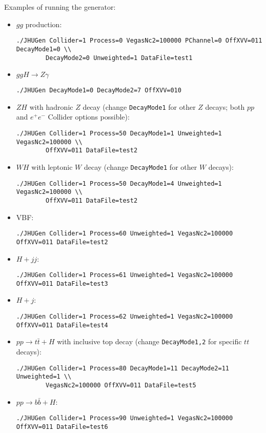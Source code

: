\documentclass[aps,superscriptaddress,nofootinbib]{revtex4}
\begin{document}
Examples of running the generator:
\begin{itemize}
\item $gg$ production:
\begin{verbatim}
./JHUGen Collider=1 Process=0 VegasNc2=100000 PChannel=0 OffXVV=011 DecayMode1=0 \\
		DecayMode2=0 Unweighted=1 DataFile=test1
\end{verbatim}
\item $ggH \to Z\gamma$
\begin{verbatim}
./JHUGen DecayMode1=0 DecayMode2=7 OffXVV=010
\end{verbatim}
\item $ZH$ with hadronic $Z$ decay (change \verb|DecayMode1| for other $Z$ decays; both $pp$ and $e^+e^-$ Collider options possible):
\begin{verbatim}
./JHUGen Collider=1 Process=50 DecayMode1=1 Unweighted=1 VegasNc2=100000 \\
		OffXVV=011 DataFile=test2
\end{verbatim}
\item $WH$ with leptonic $W$ decay (change \verb|DecayMode1| for other $W$ decays):
\begin{verbatim}
./JHUGen Collider=1 Process=50 DecayMode1=4 Unweighted=1 VegasNc2=100000 \\
		OffXVV=011 DataFile=test2
\end{verbatim}
\item VBF:
\begin{verbatim}
./JHUGen Collider=1 Process=60 Unweighted=1 VegasNc2=100000 OffXVV=011 DataFile=test2
\end{verbatim}
\item $H+jj$:
\begin{verbatim}
./JHUGen Collider=1 Process=61 Unweighted=1 VegasNc2=100000 OffXVV=011 DataFile=test3
\end{verbatim}
\item $H+j$:
\begin{verbatim}
./JHUGen Collider=1 Process=62 Unweighted=1 VegasNc2=100000 OffXVV=011 DataFile=test4
\end{verbatim}
\item $pp \to t\bar{t}+H$ with inclusive top decay (change \verb|DecayMode1,2| for specific $tt$ decays):
\begin{verbatim}
./JHUGen Collider=1 Process=80 DecayMode1=11 DecayMode2=11 Unweighted=1 \\
		VegasNc2=100000 OffXVV=011 DataFile=test5
\end{verbatim}
\item $pp \to b\bar{b}+H$:
\begin{verbatim}
./JHUGen Collider=1 Process=90 Unweighted=1 VegasNc2=100000 OffXVV=011 DataFile=test6
\end{verbatim}
\end{itemize}
\end{document}
